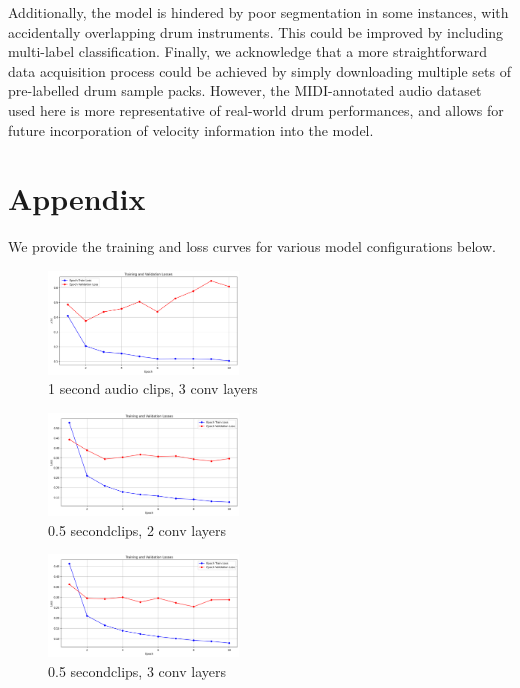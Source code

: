 \documentclass[twocolumn]{article}
\begin{document}
Additionally, the model is hindered by poor segmentation in some instances, with accidentally overlapping drum instruments.
This could be improved by including multi-label classification.
Finally, we acknowledge that a more straightforward data acquisition process could be achieved by simply downloading multiple sets of pre-labelled drum sample packs.
However, the MIDI-annotated audio dataset used here is more representative of real-world drum performances, and allows for future incorporation of velocity information into the model.

\section{Appendix}

We provide the training and loss curves for various model configurations below.
\begin{figure}
\centering
\includegraphics[width=0.45\textwidth]{figures/loss_plot_1s_3conv.png}
\caption{1 second audio clips, 3 conv layers}
\label{fig:1s_3conf}
\end{figure}

\begin{figure}
\centering
\includegraphics[width=0.45\textwidth]{figures/loss_plot_halfs_2conv.png}
\caption{0.5 secondclips, 2 conv layers}
\label{fig:halfs_2conv}
\end{figure}

\begin{figure}
\centering
\includegraphics[width=0.45\textwidth]{figures/loss_plot_halfs_3conv.png}
\caption{0.5 secondclips, 3 conv layers}
\label{fig:halfs_3conv}
\end{figure}
\end{document}
